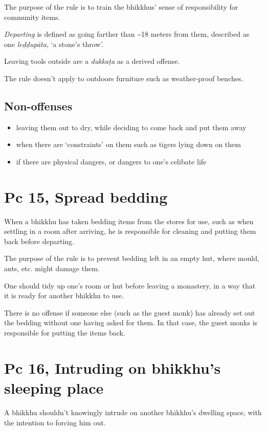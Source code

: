 The purpose of the rule is to train the bhikkhus' sense of
responsibility for community items.

\emph{Departing} is defined as going farther than \textasciitilde18
meters from them, described as one \emph{leḍḍupāta}, `a stone's throw'.

Leaving tools outside are a \emph{dukkaṭa} as a derived offense.

The rule doesn't apply to outdoors furniture such as weather-proof
benches.

\subsection{Non-offenses}

\begin{itemize}
\tightlist
\item
  leaving them out to dry, while deciding to come back and put them away
\item
  when there are `constraints' on them such as tigers lying down on them
\item
  if there are physical dangers, or dangers to one's celibate life
\end{itemize}

\section{Pc 15, Spread bedding}

When a bhikkhu has taken bedding items from the stores for use, such as
when settling in a room after arriving, he is responsible for cleaning
and putting them back before departing.

The purpose of the rule is to prevent bedding left in an empty hut,
where mould, ants, etc. might damage them.

One should tidy up one's room or hut before leaving a monastery, in a
way that it is ready for another bhikkhu to use.

There is no offense if someone else (such as the guest monk) has already
set out the bedding without one having asked for them. In that case, the
guest monks is responsible for putting the items back.

\section{Pc 16, Intruding on bhikkhu's sleeping place}

A bhikkhu shouldn't knowingly intrude on another bhikkhu's dwelling
space, with the intention to forcing him out.

